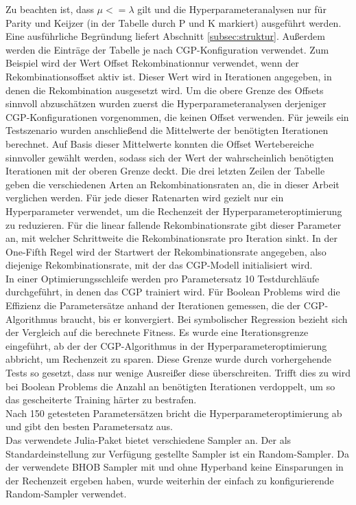Zu beachten ist, dass $\mu <= \lambda$ gilt und die Hyperparameteranalysen nur für Parity und Keijzer (in der Tabelle durch P und K markiert) ausgeführt werden.
Eine ausführliche Begründung liefert Abschnitt \ref{subsec:struktur}.
Außerdem werden die Einträge der Tabelle je nach CGP-Konfiguration verwendet.
Zum Beispiel wird der Wert \glqq Offset Rekombination\grqq\space nur verwendet, wenn der Rekombinationsoffset aktiv ist. 
Dieser Wert wird in Iterationen angegeben, in denen die Rekombination ausgesetzt wird.
Um die obere Grenze des Offsets sinnvoll abzuschätzen wurden zuerst die Hyperparameteranalysen derjeniger CGP-Konfigurationen vorgenommen, die keinen Offset verwenden.
Für jeweils ein Testszenario wurden anschließend die Mittelwerte der benötigten Iterationen berechnet.
Auf Basis dieser Mittelwerte konnten die Offset Wertebereiche sinnvoller gewählt werden, sodass sich der Wert der wahrscheinlich benötigten Iterationen mit der oberen Grenze deckt.
Die drei letzten Zeilen der Tabelle geben die verschiedenen Arten an Rekombinationsraten an, die in dieser Arbeit verglichen werden.
Für jede dieser Ratenarten wird gezielt nur ein Hyperparameter verwendet, um die Rechenzeit der Hyperparameteroptimierung zu reduzieren.
Für die linear fallende Rekombinationsrate gibt dieser Parameter an, mit welcher Schrittweite die Rekombinationsrate pro Iteration sinkt.
In der One-Fifth Regel wird der Startwert der Rekombinationsrate angegeben, also diejenige Rekombinationsrate, mit der das CGP-Modell initialisiert wird.\\

In einer Optimierungsschleife werden pro Parametersatz 10 Testdurchläufe durchgeführt, in denen das CGP trainiert wird.
Für Boolean Problems wird die Effizienz die Parametersätze anhand der Iterationen gemessen, die der CGP-Algorithmus braucht, bis er konvergiert.
Bei symbolischer Regression bezieht sich der Vergleich auf die berechnete Fitness.
Es wurde eine Iterationsgrenze eingeführt, ab der der CGP-Algorithmus in der Hyperparameteroptimierung abbricht, um Rechenzeit zu sparen.
Diese Grenze wurde durch vorhergehende Tests so gesetzt, dass nur wenige Ausreißer diese überschreiten.
Trifft dies zu wird bei Boolean Problems die Anzahl an benötigten Iterationen verdoppelt, um so das gescheiterte Training härter zu bestrafen.\\
Nach 150 getesteten Parametersätzen bricht die Hyperparameteroptimierung ab und gibt den besten Parametersatz aus.\\

Das verwendete Julia-Paket bietet verschiedene Sampler an.
Der als Standardeinstellung zur Verfügung gestellte Sampler ist ein Random-Sampler.
Da der verwendete BHOB Sampler mit und ohne Hyperband keine Einsparungen in der Rechenzeit ergeben haben, wurde weiterhin der einfach zu konfigurierende Random-Sampler verwendet. 

